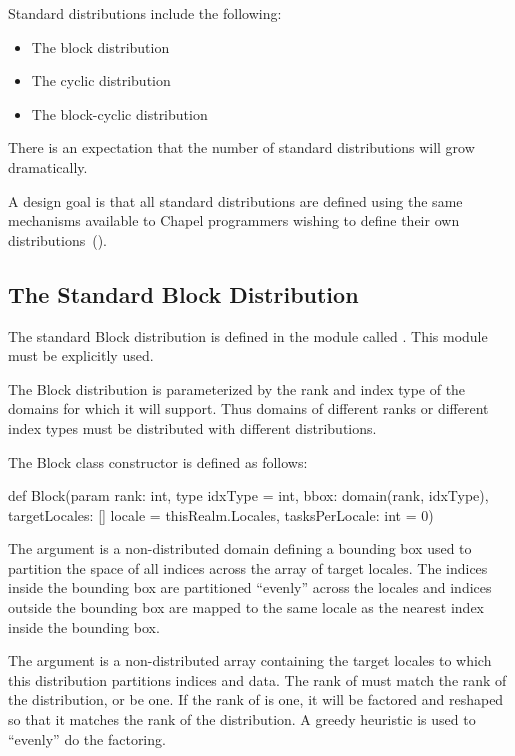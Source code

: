 \label{Standard_Distributions}

Standard distributions include the following:
\begin{itemize}
\item The block distribution 
\item The cyclic distribution 
\item The block-cyclic distribution 
\end{itemize}

\begin{openissue}
There is an expectation that the number of standard distributions will
grow dramatically.
\end{openissue}

A design goal is that all standard distributions are defined using the
same mechanisms available to Chapel programmers wishing to define
their own distributions~().

\subsection{The Standard Block Distribution}
\label{Block_Dist}

The standard Block distribution is defined in the module
called .  This module must be explicitly used.

The Block distribution is parameterized by the rank and index type of
the domains for which it will support.  Thus domains of different
ranks or different index types must be distributed with different
distributions.

The Block class constructor is defined as follows:
\begin{chapel}
def Block(param rank: int,
          type idxType = int,
          bbox: domain(rank, idxType),
          targetLocales: [] locale = thisRealm.Locales, 
          tasksPerLocale: int = 0)
\end{chapel}

The argument  is a non-distributed domain defining a
bounding box used to partition the space of all indices across the
array of target locales.  The indices inside the bounding box are
partitioned ``evenly'' across the locales and indices outside the
bounding box are mapped to the same locale as the nearest index inside
the bounding box.

The argument  is a non-distributed array
containing the target locales to which this distribution partitions
indices and data.  The rank of  must match the
rank of the distribution, or be one.  If the rank
of  is one, it will be factored and reshaped so
that it matches the rank of the distribution.  A greedy heuristic is
used to ``evenly'' do the factoring.

